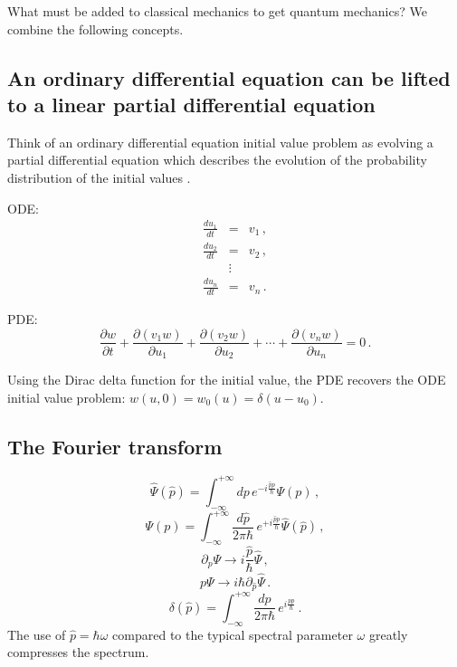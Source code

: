 \documentclass[12pt]{article}
\begin{document}
What must be added to classical mechanics to get quantum mechanics? We combine the following concepts.

\subsection{An ordinary differential equation can be lifted to a linear partial differential equation}

Think of an ordinary differential equation initial value problem as evolving a
partial differential equation which describes the evolution of the probability distribution of the initial values \cite{john1982}.

ODE:
\begin{eqnarray}
\frac{du_1}{dt} &=& v_1 \,, \\
\frac{du_2}{dt} &=& v_2 \,, \\
&\vdots& \\
\frac{du_n}{dt} &=& v_n \,.
\end{eqnarray}

PDE:
\begin{equation}
\frac{\partial w}{\partial t}
+ \frac{\partial (v_1 w)}{\partial u_1}
+ \frac{\partial (v_2 w)}{\partial u_2}
+ \cdots
+ \frac{\partial (v_n w)}{\partial u_n}
= 0 \,.
\end{equation}

Using the Dirac delta function for the initial value, the PDE recovers the ODE initial value
problem: $w(u,0) = w_0(u) = \delta(u-u_0)$.

\subsection{The Fourier transform}

\begin{equation}\label{eq:fourier-transform}
\hat{\Psi}(\hat{p}) = \int_{-\infty}^{+\infty} dp \, e^{-i \frac{\hat{p} p}{\hbar}}\Psi(p) \,,
\end{equation}
\begin{equation}
\Psi(p) = \int_{-\infty}^{+\infty} \frac{d\hat{p}}{2\pi \hbar} \, e^{+i \frac{\hat{p} p}{\hbar}} \hat{\Psi}(\hat{p}) \,,
\end{equation}
\begin{equation}
\partial_p \Psi \rightarrow i \frac{\hat{p}}{\hbar} \hat{\Psi} \,,
\end{equation}
\begin{equation}
p\Psi \rightarrow i \hbar \partial_{\hat{p}} \hat{\Psi} \,.
\end{equation}
\begin{equation}
\delta(\hat{p})= \int_{-\infty}^{+\infty} \frac{dp}{2\pi \hbar} \, e^{ i \frac{\hat{p} p}{\hbar}} \,.
\end{equation}
The use of $\hat{p} = \hbar \omega$ compared to the typical spectral parameter $\omega$ greatly compresses the spectrum.
\end{document}

